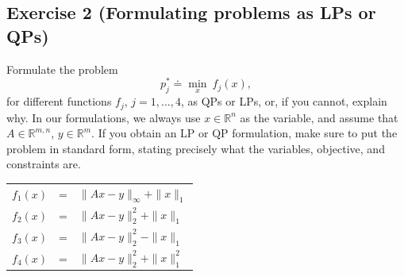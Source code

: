 \documentclass[11pt]{article}
\begin{document}
\newpage
\subsection*{Exercise 2 (Formulating problems as LPs or QPs)}

Formulate the problem
\[
p_j^* \doteq \min_x \: f_j(x),
\]
for different functions $f_j$, $j=1,\ldots,4$, as QPs or LPs, or, if you cannot, explain why.
In our formulations, we always use $x \in \mathbb{R}^{n}$ as the variable, and assume that $A \in \mathbb{R}^{m,n}$, $y \in \mathbb{R}^{m}$. If you obtain an LP or QP formulation, make sure to put the problem in standard form, stating precisely what the variables, objective, and constraints are.
\begin{center}
\begin{tabular}{rcl}
$f_1(x)$  &=& $\|Ax-y\|_\infty +\|x\|_1$ \\
$f_2(x)$  &=& $\|Ax-y\|_2^2 + \|x\|_1$ \\
$f_3(x)$  &=& $\|Ax-y\|_2^2 - \|x\|_1$ \\
$f_4(x)$  &=& $\|Ax-y\|_2^2 + \|x\|_1^2$
\end{tabular}
\end{center}
\end{document}
